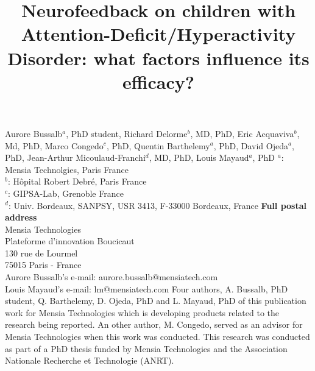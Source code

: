 

\title{Neurofeedback on children with Attention-Deficit/Hyperactivity Disorder: what factors influence its efficacy?} %
\maketitle
\noindent Aurore Bussalb$^a$, PhD student, Richard Delorme$^b$, MD, PhD, Eric Acquaviva$^b$, Md, PhD, Marco Congedo$^c$, PhD, 
Quentin Barthelemy$^a$, PhD, David Ojeda$^a$, PhD, Jean-Arthur Micoulaud-Franchi$^d$, MD, PhD, Louis Mayaud$^a$, PhD 
\smallbreak
\noindent $^a$: Mensia Technolgies, Paris France \\
\noindent $^b$: Hôpital Robert Debré, Paris France \\ %
\noindent $^c$: GIPSA-Lab, Grenoble France \\
\noindent $^d$: Univ. Bordeaux, SANPSY, USR 3413, F-33000 Bordeaux, France 
\smallbreak
\noindent\textbf{Full postal address} \\
Mensia Technologies \\
Plateforme d'innovation Boucicaut \\
130 rue de Lourmel \\
75015 Paris - France \\
Aurore Bussalb's e-mail: aurore.bussalb@mensiatech.com \\
Louis Mayaud's e-mail: lm@mensiatech.com 
\smallbreak
Four authors, A. Bussalb, PhD student, Q. Barthelemy, D. Ojeda, PhD and L. Mayaud, PhD of this publication work for Mensia Technologies which is developing products related to the research being reported.
An other author, M. Congedo, served as an advisor for Mensia Technologies when this work was conducted. 
\smallbreak
This research was conducted as part of a PhD thesis funded by Mensia Technologies and the Association Nationale Recherche et Technologie (ANRT).